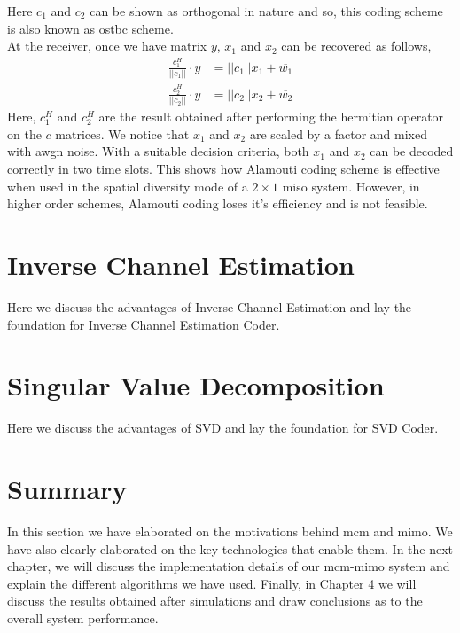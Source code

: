 Here $c_1$ and $c_2$ can be shown as orthogonal in nature and so, this coding scheme is also known as \acrlong{ostbc} scheme.\\
At the receiver, once we have matrix $y$, $x_1$ and $x_2$ can be recovered as follows,
\begin{align*}
\frac{c_1^H}{||c_1||} \cdot y &= ||c_1||x_1 + \overline{w_1}\\
\frac{c_2^H}{||c_2||} \cdot y &= ||c_2||x_2 + \overline{w_2}
\end{align*}
Here, $c_1^H$ and $c_2^H$ are the result obtained after performing the hermitian operator on the $c$ matrices. We notice that $x_1$ and $x_2$ are scaled by a factor and mixed with \acrshort{awgn} noise. With a suitable decision criteria, both $x_1$ and $x_2$ can be decoded correctly in two time slots. This shows how Alamouti coding scheme is effective when used in the \gls{spatial diversity} mode of a $2 \times 1$ \acrshort{miso} system. However, in higher order schemes, Alamouti coding loses it's efficiency and is not feasible.

\section{Inverse Channel Estimation}
Here we discuss the advantages of Inverse Channel Estimation and lay the foundation for Inverse Channel Estimation Coder.

\section{Singular Value Decomposition}
Here we discuss the advantages of SVD and lay the foundation for SVD Coder.

\section*{Summary}
In this section we have elaborated on the motivations behind \acrshort{mcm} and \acrshort{mimo}. We have also clearly elaborated on the key technologies that enable them. In the next chapter, we will discuss the implementation details of our \acrshort{mcm}-\acrshort{mimo} system and explain the different algorithms we have used. Finally, in Chapter 4 we will discuss the results obtained after simulations and draw conclusions as to the overall system performance.  
